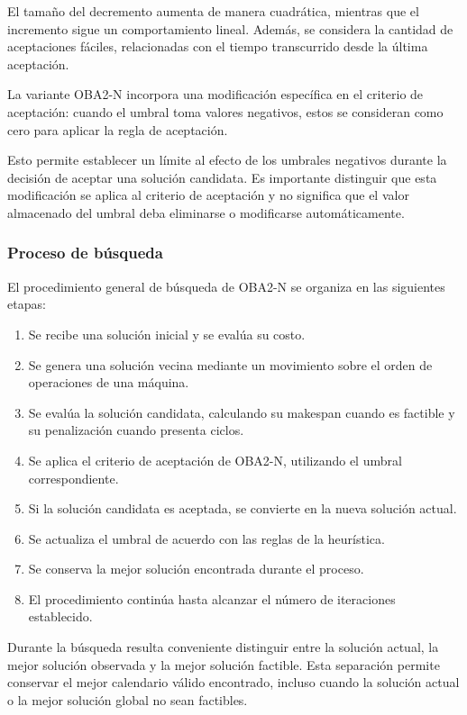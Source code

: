 \documentclass[12pt,a4paper]{article}
\begin{document}
El tamaño del decremento aumenta de manera cuadrática, mientras que el incremento sigue un comportamiento lineal. Además, se considera la cantidad de aceptaciones fáciles, relacionadas con el tiempo transcurrido desde la última
aceptación.

La variante OBA2-N incorpora una modificación específica en el criterio de aceptación: cuando el umbral toma valores negativos, estos se consideran como cero para aplicar la regla de aceptación.

Esto permite establecer un límite al efecto de los umbrales negativos durante la decisión de aceptar una solución candidata. Es importante distinguir que esta modificación se aplica al criterio de aceptación y no significa que el valor almacenado del umbral deba eliminarse o modificarse
automáticamente.

\subsubsection{Proceso de búsqueda}

El procedimiento general de búsqueda de OBA2-N se organiza
en las siguientes etapas:

\begin{enumerate}
    \item Se recibe una solución inicial y se evalúa su costo.
    \item Se genera una solución vecina mediante un movimiento
    sobre el orden de operaciones de una máquina.
    \item Se evalúa la solución candidata, calculando su
    makespan cuando es factible y su penalización cuando
    presenta ciclos.
    \item Se aplica el criterio de aceptación de OBA2-N,
    utilizando el umbral correspondiente.
    \item Si la solución candidata es aceptada, se convierte
    en la nueva solución actual.
    \item Se actualiza el umbral de acuerdo con las reglas
    de la heurística.
    \item Se conserva la mejor solución encontrada durante
    el proceso.
    \item El procedimiento continúa hasta alcanzar el número
    de iteraciones establecido.
\end{enumerate}

Durante la búsqueda resulta conveniente distinguir entre la solución actual, la mejor solución observada y la mejor solución factible. Esta separación permite conservar el mejor calendario válido encontrado, incluso cuando la solución actual o la mejor solución global no sean
factibles.
\end{document}
